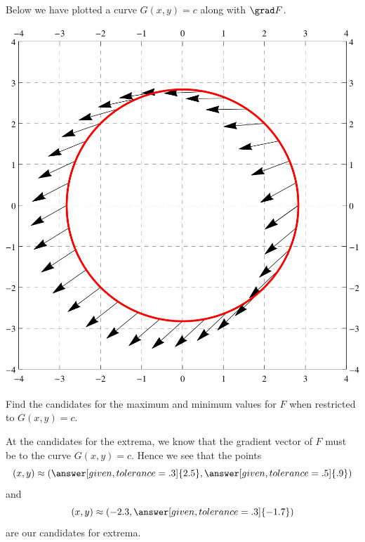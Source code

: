 \documentclass{ximera}
\begin{document}
\begin{example}
  Below we have plotted a curve $G(x,y) = c$ along with $\grad F$.
  \begin{image}
    \includegraphics{curveVectors2.jpg}
  \end{image}
  Find the candidates for the maximum and minimum values for $F$ when
  restricted to $G(x,y) = c$.
  \begin{explanation}
    At the candidates for the extrema, we know that the gradient
    vector of $F$ must be
     to
    the curve $G(x,y) = c$. Hence we see that the points
    \[
    (x,y)\approx(\answer[given,tolerance=.3]{2.5},\answer[given,tolerance=.5]{.9})
    \]
    and
    \[
    (x,y)\approx (-2.3,\answer[given,tolerance=.3]{-1.7})
    \]
    are our candidates for extrema.
  \end{explanation}
\end{example}
\end{document}
